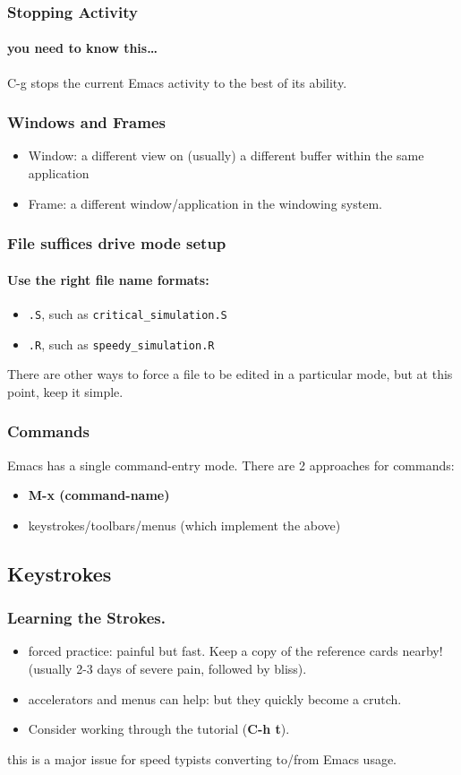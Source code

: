 \documentclass{beamer}
\begin{document}
\begin{frame} \frametitle{Stopping Activity}
  \framesubtitle{you need to know this\ldots}
  \alert{C-g} stops the current Emacs activity to the best of its ability.
\end{frame}

\begin{frame}
  \frametitle{Windows and Frames}
  \begin{itemize}
  \item Window:  a different view on (usually) a different buffer within the same application
  \item Frame: a different window/application in the windowing system.
  \end{itemize}
\end{frame}

\begin{frame}[fragile]
  \frametitle{File suffices drive mode setup}
  \framesubtitle{Use the right file name formats:}
  \begin{itemize}
  \item \verb+.S+, such as \verb+critical_simulation.S+
  \item \verb+.R+, such as \verb+speedy_simulation.R+
  \end{itemize}
  There are other ways to force a file to be edited in a particular
  mode, but at this point, keep it simple.
\end{frame}

\begin{frame}
  \frametitle{Commands}
  
  Emacs has a single command-entry mode.  There are 2 approaches for commands:
  \begin{itemize}
    \item \textbf{M-x (command-name)}
    \item keystrokes/toolbars/menus (which implement the above)
  \end{itemize}
  
\end{frame}

\subsection{Keystrokes}

\begin{frame}
  \frametitle{Learning the Strokes.}
  \begin{itemize}
  \item forced practice: painful but fast.  Keep a copy of the
    reference cards nearby!  (usually 2-3 days of severe pain,
    followed by bliss).
  \item accelerators and menus can help: but they quickly become a crutch.
  \item Consider working through the tutorial (\textbf{C-h t}).
  \end{itemize}
  \alert{this is a major issue for speed typists converting to/from
    Emacs usage.}
\end{frame}
\end{document}
